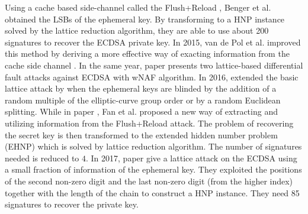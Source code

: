 Using a cache based side-channel called the Flush+Reload \cite{flushreload}, Benger et al. \cite{Benger2014} obtained the
LSBs of the ephemeral key. By transforming to a HNP instance solved by the lattice reduction algorithm, they are able to use about 200 signatures to recover the ECDSA private key.
In 2015, van de Pol et al. improved this method by deriving a more effective way of exacting information from the cache side channel \cite{Van2015}.
In the same year, paper \cite{Cao2015} presents two lattice-based differential fault attacks against ECDSA with wNAF algorithm.
In 2016, \cite{Dahmun2016}  extended the basic lattice attack by when the ephemeral keys are blinded by the addition of a random multiple of the elliptic-curve group order or by a random Euclidean splitting.
While in paper \cite{Fan2016}, Fan et al. proposed a new way of extracting and utilizing information from the Flush+Reload attack. The problem of recovering the
secret key is then transformed to the extended hidden number problem (EHNP) which is solved by lattice reduction algorithm. The number of signatures needed is reduced to $4$.
In 2017, paper \cite{Wang2017} give a lattice attack on the ECDSA using
 a small fraction of information of the ephemeral key.
They exploited the positions of the second non-zero digit and the last non-zero
digit (from the higher index) together with the length of the chain to construct a HNP instance. They need 85 signatures to recover the private key.


%

